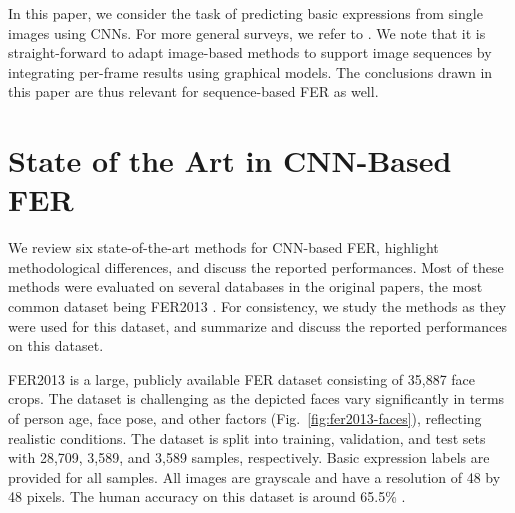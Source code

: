 \documentclass[conference,10pt,a4paper]{IEEEtran}
\begin{document}
In this paper, we consider the task of predicting basic expressions from single images using CNNs. For more general surveys, we refer to \cite{sariyanidi15,martinez16}. We note that it is straight-forward to adapt image-based methods to support image sequences by integrating per-frame results using graphical models. The conclusions drawn in this paper are thus relevant for sequence-based FER as well.



\section{State of the Art in CNN-Based FER}
\label{sec:state_of_the_art}



We review six state-of-the-art methods for CNN-based FER, highlight methodological differences, and discuss the reported performances. Most of these methods were evaluated on several databases in the original papers, the most common dataset being FER2013 \cite{goodfellow15}. For consistency, we study the methods as they were used for this dataset, and summarize and discuss the reported performances on this dataset.

FER2013 is a large, publicly available FER dataset consisting of 35,887 face crops. The dataset is challenging as the depicted faces vary significantly in terms of person age, face pose, and other factors (Fig.~\ref{fig:fer2013-faces}), reflecting realistic conditions. The dataset is split into training, validation, and test sets with 28,709, 3,589, and 3,589 samples, respectively. Basic expression labels are provided for all samples. All images are grayscale and have a resolution of 48 by 48 pixels. The human accuracy on this dataset is around 65.5\% \cite{goodfellow15}.
\end{document}
